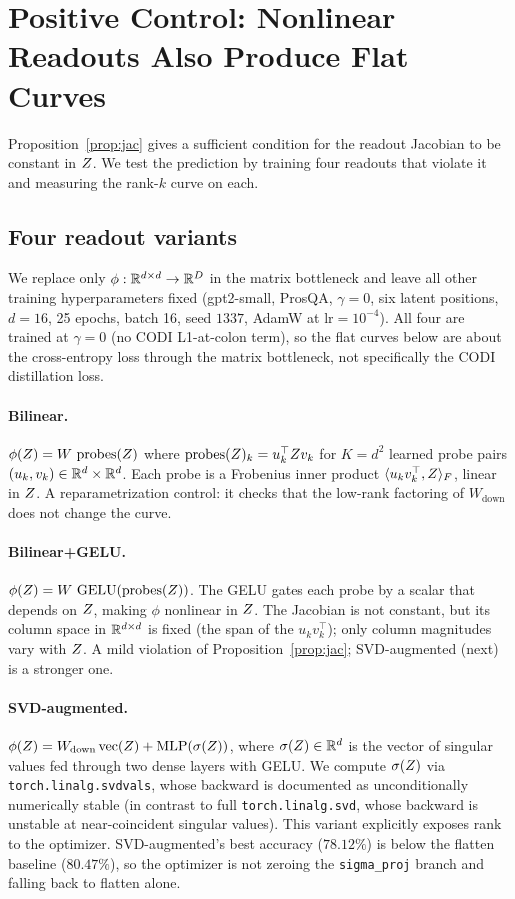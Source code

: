 \section{Positive Control: Nonlinear Readouts Also Produce Flat Curves}
\label{sec:pc}

Proposition~\ref{prop:jac} gives a sufficient condition for the
readout Jacobian to be constant in $Z$. We test the prediction by
training four readouts that violate it and measuring the rank-$k$
curve on each.

\subsection{Four readout variants}

We replace only $\phi:\mathbb{R}^{d\times d}\to\mathbb{R}^D$ in the matrix bottleneck
and leave all other training hyperparameters fixed (gpt2-small,
ProsQA, $\gamma=0$, six latent positions, $d=16$, 25 epochs, batch
16, seed $1337$, AdamW at $\text{lr}=10^{-4}$). All four are trained
at $\gamma=0$ (no CODI L1-at-colon term), so the flat curves below
are about the cross-entropy loss through the matrix bottleneck, not
specifically the CODI distillation loss.

\paragraph{Bilinear.} $\phi(Z) = W\,\operatorname{probes}(Z)$
where $\operatorname{probes}(Z)_k = u_k^\top Z v_k$ for $K=d^2$
learned probe pairs $(u_k,v_k)\in\mathbb{R}^d\times\mathbb{R}^d$. Each probe is a
Frobenius inner product $\langle u_k v_k^\top,Z\rangle_F$, linear
in $Z$. A reparametrization control: it checks that the low-rank
factoring of $W_{\text{down}}$ does not change the curve.

\paragraph{Bilinear+GELU.} $\phi(Z) = W\,\operatorname{GELU}(
\operatorname{probes}(Z))$. The GELU gates each probe by a scalar
that depends on $Z$, making $\phi$ nonlinear in $Z$. The Jacobian
is not constant, but its column space in $\mathbb{R}^{d\times d}$ is fixed
(the span of the $u_k v_k^\top$); only column magnitudes vary with
$Z$. A mild violation of Proposition~\ref{prop:jac}; SVD-augmented
(next) is a stronger one.

\paragraph{SVD-augmented.} $\phi(Z) = W_{\text{down}}\operatorname{vec}(Z) +
\operatorname{MLP}(\sigma(Z))$, where $\sigma(Z)\in\mathbb{R}^d$ is the
vector of singular values fed through two dense layers with GELU.
We compute $\sigma(Z)$ via \texttt{torch.linalg.svdvals}, whose
backward is documented as unconditionally numerically stable (in
contrast to full \texttt{torch.linalg.svd}, whose backward is
unstable at near-coincident singular values). This variant
explicitly exposes rank to the optimizer. SVD-augmented's best
accuracy ($78.12\%$) is below the flatten baseline ($80.47\%$), so
the optimizer is not zeroing the \texttt{sigma\_proj} branch and
falling back to flatten alone.

